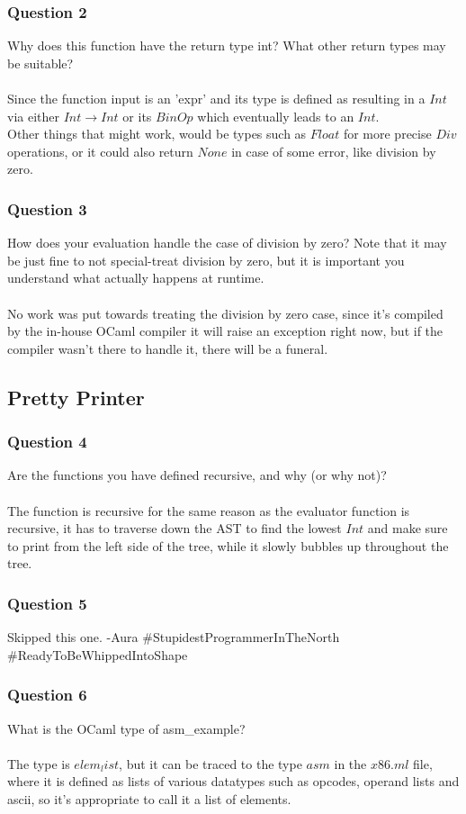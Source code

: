 \documentclass[12pt]{article}
\begin{document}
\subsubsection*{Question 2}
Why does this function have the return type int? What other return types may be
suitable?\\\\
Since the function input is an 'expr' and its type is defined as resulting in a $Int$ via either $Int \rightarrow Int$ or its $BinOp$ which eventually leads to an $Int$.\\
Other things that might work, would be types such as $Float$ for more precise $Div$ operations, or it could also return $None$ in case of some error, like division by zero.
\subsubsection*{Question 3}
How does your evaluation handle the case of division by zero? Note that it may be just
fine to not special-treat division by zero, but it is important you understand what actually
happens at runtime.\\\\
No work was put towards treating the division by zero case, since it's compiled by the in-house OCaml compiler
 it will raise an exception right now, but if the compiler wasn't there to handle it, there will be a funeral.

\subsection*{Pretty Printer}
\subsubsection*{Question 4}
Are the functions you have defined recursive, and why (or why not)?\\\\
The function is recursive for the same reason as the evaluator function is recursive, it has to traverse down
 the AST to find the lowest $Int$ and make sure to print from the left side of the tree, while it slowly bubbles
  up throughout the tree.  
\subsubsection*{Question 5}
Skipped this one. -Aura \#StupidestProgrammerInTheNorth \#ReadyToBeWhippedIntoShape
\subsubsection*{Question 6}
What is the OCaml type of asm\_example?\\\\
The type is $elem_list$, but it can be traced to the type $asm$ in the $x86.ml$ file, where it is defined as lists of various datatypes such as opcodes, operand lists and ascii, so it's appropriate to call it a list of elements.  
\end{document}
